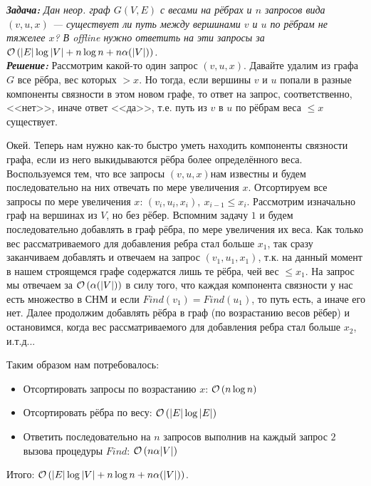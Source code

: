 \textit{
\textbf{Задача:} Дан неор. граф $G(V,E)$ с весами на рёбрах и $n$ запросов вида $(v, u, x)$ --- существует ли путь
между вершинами $v$ и $u$ по рёбрам не тяжелее $x$? В offline нужно ответить на эти запросы за
$\mathcal{O}\left(|E|\log{|V|}+n\log{n}+n\alpha{(|V|)}\right)$.\\
}
\textbf{\textit{Решение:}} Рассмотрим какой-то один запрос $(v,u,x)$. Давайте удалим из графа $G$ все рёбра,
вес которых $> x$. Но тогда, если вершины $v$ и $u$ попали в разные компоненты связности в этом новом графе, то
ответ на запрос, соответственно, <<нет>>, иначе ответ <<да>>, т.е. путь из $v$ в $u$ по рёбрам веса $\leq x$ существует.


Окей. Теперь нам нужно как-то быстро уметь находить компоненты связности графа, если из него выкидываются рёбра более
определённого веса. Воспользуемся тем, что все запросы $(v,u,x)$нам известны и будем последовательно на
них отвечать по мере увеличения $x$. Отсортируем все запросы по мере увеличения $x$: $(v_i,u_i,x_i),\ x_{i-1} \leq x_i$.
Рассмотрим изначально граф на вершинах из $V$, но без рёбер. Вспомним задачу $1$ и будем последовательно добавлять
в граф рёбра, по мере увеличения их веса. Как только вес рассматриваемого для добавления ребра стал больше $x_1$,
так сразу заканчиваем добавлять и отвечаем на запрос $(v_1,u_1,x_1)$, т.к. на данный момент в нашем строящемся графе
содержатся лишь те рёбра, чей вес $\leq x_1$. На запрос мы отвечаем за $\mathcal{O}\left(\alpha{(|V|)}\right)$ в силу того, что каждая
компонента связности у нас есть множество в СНМ и если $Find(v_1)=Find(u_1)$, то путь есть, а иначе его нет. Далее продолжим добавлять рёбра в граф (по возрастанию весов рёбер) и остановимся, когда вес рассматриваемого для добавления
ребра стал больше $x_2$, и.т.д...


Таким образом нам потребовалось:
\begin{itemize}
	\item Отсортировать запросы по возрастанию $x$: $\mathcal{O}\left(n\log{n}\right)$
	\item Отсортировать рёбра по весу: $\mathcal{O}\left(|E|\log{|E|}\right)$
	\item Ответить последовательно на $n$ запросов выполнив на каждый запрос $2$ вызова процедуры $Find$:
	$\mathcal{O}\left(n\alpha{|V|}\right)$
\end{itemize}
Итого: $\mathcal{O}\left(|E|\log{|V|}+n\log{n}+n\alpha{(|V|)}\right)$. \xqed

